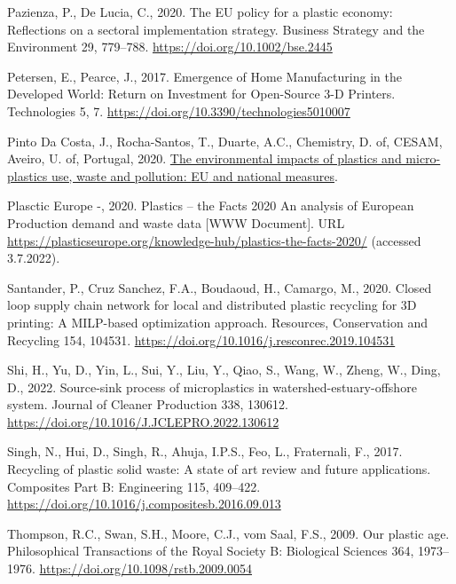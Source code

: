 \documentclass[]{elsarticle} %
\newlength{\cslhangindent}
\newlength{\cslentryspacingunit} %
\newenvironment{CSLReferences}[2] %
 {%
  \setlength{\parindent}{0pt}
  \ifodd #1
  \let\oldpar\par
  \def\par{\hangindent=\cslhangindent\oldpar}
  \fi
  \setlength{\parskip}{#2\cslentryspacingunit}
 }%
 {}
\begin{document}
\begin{CSLReferences}{1}{0}
\leavevmode{}%
Pazienza, P., De Lucia, C., 2020. The {EU} policy for a plastic economy: {Reflections} on a sectoral implementation strategy. Business Strategy and the Environment 29, 779--788. \url{https://doi.org/10.1002/bse.2445}

\leavevmode{}%
Petersen, E., Pearce, J., 2017. Emergence of {Home Manufacturing} in the {Developed World}: {Return} on {Investment} for {Open-Source} 3-{D Printers}. Technologies 5, 7. \url{https://doi.org/10.3390/technologies5010007}

\leavevmode{}%
Pinto Da Costa, J., Rocha-Santos, T., Duarte, A.C., Chemistry, D. of, CESAM, Aveiro, U. of, Portugal, 2020. \href{https://policycommons.net/artifacts/1426661/the-environmental-impacts-of-plastics-and-micro-plastics-use-waste-and-pollution/2041108/}{The environmental impacts of plastics and micro-plastics use, waste and pollution: {EU} and national measures}.

\leavevmode{}%
Plasctic Europe -, 2020. Plastics -- the {Facts} 2020 {An} analysis of {European Production} demand and waste data {[}WWW Document{]}. URL \url{https://plasticseurope.org/knowledge-hub/plastics-the-facts-2020/} (accessed 3.7.2022).

\leavevmode{}%
Santander, P., Cruz Sanchez, F.A., Boudaoud, H., Camargo, M., 2020. Closed loop supply chain network for local and distributed plastic recycling for {3D} printing: A {MILP-based} optimization approach. Resources, Conservation and Recycling 154, 104531. \url{https://doi.org/10.1016/j.resconrec.2019.104531}

\leavevmode{}%
Shi, H., Yu, D., Yin, L., Sui, Y., Liu, Y., Qiao, S., Wang, W., Zheng, W., Ding, D., 2022. Source-sink process of microplastics in watershed-estuary-offshore system. Journal of Cleaner Production 338, 130612. \url{https://doi.org/10.1016/J.JCLEPRO.2022.130612}

\leavevmode{}%
Singh, N., Hui, D., Singh, R., Ahuja, I.P.S., Feo, L., Fraternali, F., 2017. Recycling of plastic solid waste: {A} state of art review and future applications. Composites Part B: Engineering 115, 409--422. \url{https://doi.org/10.1016/j.compositesb.2016.09.013}

\leavevmode{}%
Thompson, R.C., Swan, S.H., Moore, C.J., vom Saal, F.S., 2009. Our plastic age. Philosophical Transactions of the Royal Society B: Biological Sciences 364, 1973--1976. \url{https://doi.org/10.1098/rstb.2009.0054}


\end{CSLReferences}
\end{document}
